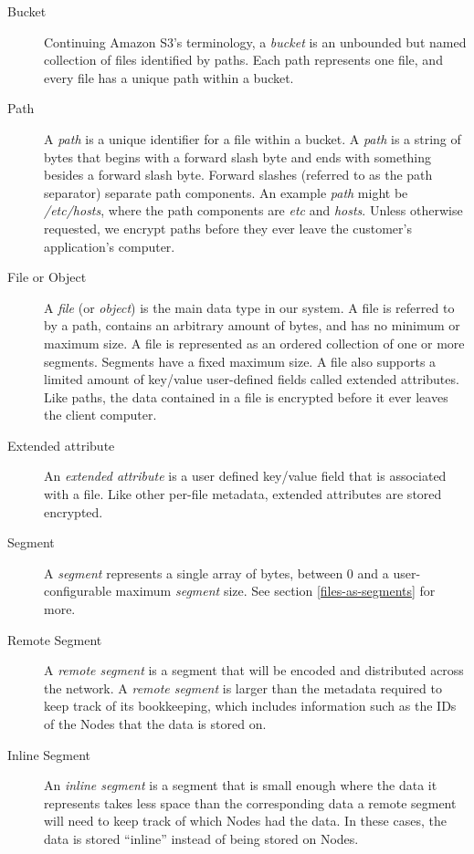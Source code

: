 \documentclass[8pt,fleqn,openany]{book}
\newcommand{\code}[1]{{\em #1}}
\begin{document}
\begin{description}
\item[Bucket] Continuing Amazon S3's terminology, a {\em bucket} is an
unbounded but named collection of files identified by paths.
Each path represents one file, and every file has a unique path within a bucket.

\item[Path] A {\em path} is a unique identifier for a file within a
bucket. A {\em path} is a string of bytes that begins with a forward
slash byte and ends with something besides a forward slash byte. Forward
slashes (referred to as the path separator) separate path components.
An example {\em path} might be \code{/etc/hosts}, where the path components are
\code{etc} and \code{hosts}.
Unless otherwise requested,
we encrypt paths before they ever leave the customer's application's
computer.

\item[File or Object] A {\em file} (or {\em object}) is the main data type in
our system. A file is referred to by a path, contains an arbitrary amount of
bytes, and has no minimum or maximum size. A file is represented as an ordered
collection of one or more segments. Segments have a fixed maximum size.
A file also supports a limited amount of key/value user-defined fields
called extended attributes.
Like paths, the data contained in a file is encrypted before it ever
leaves the client computer.

\item[Extended attribute] An {\em extended attribute} is a user defined key/value
field that is associated with a file. Like other per-file metadata,
extended attributes are stored encrypted.

\item[Segment] A {\em segment} represents a single array of bytes, between 0 and a
user-configurable maximum {\em segment} size.
See section \ref{files-as-segments} for more.

\item[Remote Segment] A {\em remote segment} is a segment that will be
encoded and distributed across the network. A {\em remote segment} is larger than
the metadata required to keep track of its bookkeeping, which includes
information such as the IDs of the Nodes that the data is stored on.

\item[Inline Segment] An {\em inline segment} is a segment that is small
enough where the data it represents takes less space than the corresponding
data a remote segment will need to keep track of which Nodes had the data.
In these cases, the data is stored ``inline'' instead of being stored on Nodes.


\end{description}
\end{document}

